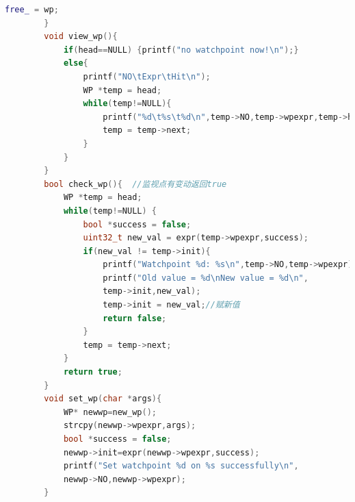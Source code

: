 \documentclass[UTF8,a4paper,10pt]{ctexart}
\begin{document}
{\begin{lstlisting}[title=指针,frame=trbl,language={C++}]
            free_ = wp;
        }
        void view_wp(){
            if(head==NULL) {printf("no watchpoint now!\n");}
            else{
                printf("NO\tExpr\tHit\n");
                WP *temp = head;
                while(temp!=NULL){
                    printf("%d\t%s\t%d\n",temp->NO,temp->wpexpr,temp->hit);
                    temp = temp->next;
                }
            }
        }
        bool check_wp(){  //监视点有变动返回true
            WP *temp = head;
            while(temp!=NULL) {
                bool *success = false;
                uint32_t new_val = expr(temp->wpexpr,success); 
                if(new_val != temp->init){
                    printf("Watchpoint %d: %s\n",temp->NO,temp->wpexpr);
                    printf("Old value = %d\nNew value = %d\n",
                    temp->init,new_val);
                    temp->init = new_val;//赋新值
                    return false;
                }
                temp = temp->next;
            }
            return true;
        }
        void set_wp(char *args){
            WP* newwp=new_wp();
            strcpy(newwp->wpexpr,args);
            bool *success = false;
            newwp->init=expr(newwp->wpexpr,success);
            printf("Set watchpoint %d on %s successfully\n",
            newwp->NO,newwp->wpexpr);
        }
    \end{lstlisting}

}
\end{document}
